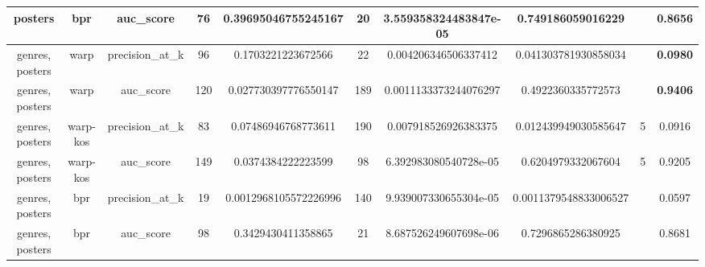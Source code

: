 \begin{table}
{\begin{tabular}{|c|c|c|c|c|c|c|c|c|c|}
\hline
posters                  & bpr                   & auc\_score                & 76     & 0.39695046755245167   & 20            & 3.559358324483847e-05  & 0.749186059016229     &      & 0.8656                    \\ 
\hline
genres, posters          & warp                  & precision\_at\_k          & 96     & 0.1703221223672566    & 22            & 0.004206346506337412   & 0.041303781930858034  &      & \textbf{0.0980}                    \\ 
\hline
genres, posters          & warp                  & auc\_score                & 120    & 0.027730397776550147  & 189           & 0.0011133373244076297  & 0.4922360335772573    &      & \textbf{0.9406}                    \\ 
\hline
genres, posters          & warp-kos              & precision\_at\_k          & 83     & 0.07486946768773611   & 190           & 0.007918526926383375   & 0.012439949030585647  & 5    & 0.0916                    \\ 
\hline
genres, posters          & warp-kos              & auc\_score                & 149    & 0.0374384222223599    & 98            & 6.392983080540728e-05  & 0.6204979332067604    & 5    & 0.9205                    \\ 
\hline
genres, posters          & bpr                   & precision\_at\_k          & 19     & 0.0012968105572226996 & 140           & 9.939007330655304e-05  & 0.0011379548833006527 &      & 0.0597                    \\ 
\hline
genres, posters          & bpr                   & auc\_score                & 98     & 0.3429430411358865    & 21            & 8.687526249607698e-06  & 0.7296865286380925    &      & 0.8681                    \\
\hline
\end{tabular}}
\end{table}

